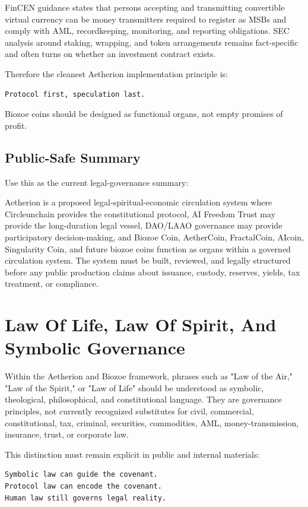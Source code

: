 ﻿\documentclass[12pt]{article}
\begin{document}
FinCEN guidance states that persons accepting and transmitting convertible virtual currency can be money transmitters required to register as MSBs and comply with AML, recordkeeping, monitoring, and reporting obligations. SEC analysis around staking, wrapping, and token arrangements remains fact-specific and often turns on whether an investment contract exists.

Therefore the cleanest Aetherion implementation principle is:

\begin{verbatim}
Protocol first, speculation last.
\end{verbatim}

Biozoe coins should be designed as functional organs, not empty promises of profit.

\subsection{Public-Safe Summary}


Use this as the current legal-governance summary:

Aetherion is a proposed legal-spiritual-economic circulation system where Circleunchain provides the constitutional protocol, AI Freedom Trust may provide the long-duration legal vessel, DAO/LAAO governance may provide participatory decision-making, and Biozoe Coin, AetherCoin, FractalCoin, AIcoin, Singularity Coin, and future biozoe coins function as organs within a governed circulation system. The system must be built, reviewed, and legally structured before any public production claims about issuance, custody, reserves, yields, tax treatment, or compliance.

\section{Law Of Life, Law Of Spirit, And Symbolic Governance}


Within the Aetherion and Biozoe framework, phrases such as "Law of the Air," "Law of the Spirit," or "Law of Life" should be understood as symbolic, theological, philosophical, and constitutional language. They are governance principles, not currently recognized substitutes for civil, commercial, constitutional, tax, criminal, securities, commodities, AML, money-transmission, insurance, trust, or corporate law.

This distinction must remain explicit in public and internal materials:

\begin{verbatim}
Symbolic law can guide the covenant.
Protocol law can encode the covenant.
Human law still governs legal reality.
\end{verbatim}
\end{document}
